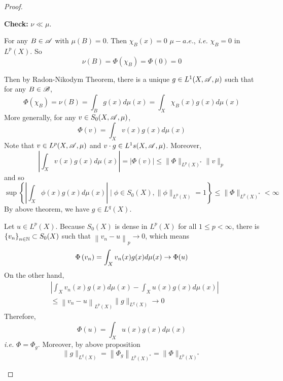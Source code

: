 \begin{proof}
\begin{itemize}
\begin{enumerate}[label=(\roman*)]
			\noindent\textbf{Check:} $\nu \ll \mu$.

			\noindent For any $B \in \mathscr{A}$ with $\mu(B) = 0$. Then $\chi_B(x) = 0$ $\mu-a.e.$, \emph{i.e.} $\chi_B =0$ in $L^p(X)$. So
			\begin{equation*}
				\nu(B)=\Phi\left(\chi_B\right)=\Phi(0)=0
			\end{equation*}

			\noindent Then by Radon-Nikodym Theorem, there is a unique $g \in L^1(X,\mathscr{A},\mu)$ such that for any $B \in \mathscr{B}$,
			\begin{equation*}
				\Phi\left(\chi_B\right)=\nu(B)=\int_B g(x) d \mu(x)=\int_X \chi_B(x) g(x) d \mu(x)
			\end{equation*}
			More generally, for any $v \in S_0(X,\mathscr{A},\mu)$, 
			\begin{equation*}
				\Phi(v)=\int_X v(x) g(x) d \mu(x)
			\end{equation*}
			Note that $v \in L^p(X,\mathscr{A},\mu)$ and $v \cdot g \in L^1s(X,\mathscr{A},\mu)$. Moreover,
			\begin{equation*}
				\left|\int_X v(x) g(x) d \mu(x)\right|=|\Phi(v)| \leq\|\Phi\|_{L^p(X)^*}\|v\|_{p}
			\end{equation*}
			and so
			\begin{equation*}
				\sup \left\{\left|\int_X \phi(x) g(x) d \mu(x)\right| \mid \phi \in S_0(X),\|\phi\|_{L^p(X)}=1\right\} \leq\|\Phi\|_{L^p(X)^*} < \infty
			\end{equation*}
			By above theorem, we have $g \in L^q(X)$. 

			\noindent Let $u \in L^p(X)$. Because $S_0(X)$ is dense in $L^p(X)$ for all $1 \leq p < \infty$, there is $\left\{v_n\right\}_{n \in \mathbb{N}} \subset S_0(X)$ such that $\left\|v_n-u\right\|_{p} \rightarrow 0$, which means
			\begin{equation*}
				\Phi\left(v_n\right)=\int_X v_n(x) g(x) d \mu(x) \rightarrow \Phi(u)
			\end{equation*}
			On the other hand,
			\begin{equation*}
				\begin{aligned}
					& \left|\int_X v_n(x) g(x) d \mu(x)-\int_X u(x) g(x) d \mu(x)\right| \\
					& \leq\left\|v_n-u\right\|_{L^p(X)}\|g\|_{L^q(X)} \longrightarrow 0
				\end{aligned}
			\end{equation*}
			Therefore, 
			\begin{equation*}
				\Phi(u)=\int_X u(x) g(x) d \mu(x)
			\end{equation*}
			\emph{i.e.} $\Phi = \Phi_g$. Moreover, by above proposition
			\begin{equation*}
				\|g\|_{L^q(X)}=\left\|\Phi_g\right\|_{L^p(X)^*}=\|\Phi\|_{L^p(X)^*}
			\end{equation*}


\end{enumerate}
\end{itemize}
\end{proof}
